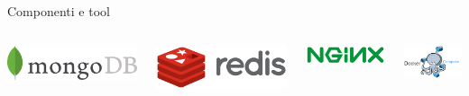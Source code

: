 \documentclass[aspectratio=169]{beamer}
\begin{document}
\begin{frame}{Componenti e tool}
    \begin{columns}[T]
        \begin{column}{0.25\textwidth}
            \includegraphics[width=\textwidth]{img/mongodb_logo.jpg}
        \end{column}
        \begin{column}{0.25\textwidth}
            \includegraphics[width=\textwidth]{img/redis_logo.png}
        \end{column}
        \begin{column}{0.25\textwidth}
            \vspace{0.10cm}
            \includegraphics[width=\textwidth]{img/nginx_logo.png}
        \end{column}
        \begin{column}{0.25\textwidth}
            \vspace{-0.5cm}
            \includegraphics[width=\textwidth]{img/docker_compose_logo.png}

\end{column}
\end{columns}
\end{frame}
\end{document}

